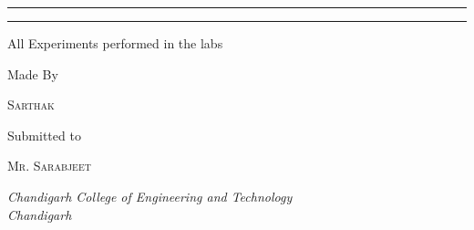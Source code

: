 \begin{titlepage}
	\vspace{0.75\baselineskip} %
	
	\rule{\textwidth}{0.4pt}\vspace*{-\baselineskip}\vspace{3.2pt} %
	\rule{\textwidth}{1.6pt} %
	
	\vspace{2\baselineskip} %
	
	
	All Experiments performed in the labs %
	
	\vspace*{3\baselineskip} %
	
	
	Made By
	
	\vspace{0.5\baselineskip} %
	
	{\scshape\Large Sarthak \\} %
	
	\vfill %
	
	
	Submitted to 
	
	\vspace{0.5\baselineskip} %
	
	{\scshape\Large Mr. Sarabjeet \\} %
	
	\vspace{0.5\baselineskip} %
	
	\textit{Chandigarh College of Engineering and Technology \\ Chandigarh} %
	
	\vfill %
	

\end{titlepage}